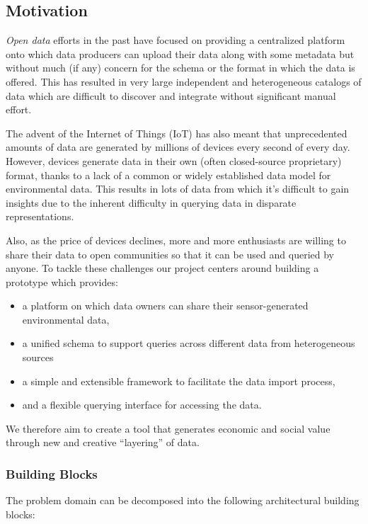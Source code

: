 \subsection{Motivation}\label{motivation}

\emph{Open data} efforts in the past have focused on providing a
centralized platform onto which data producers can upload their data
along with some metadata but without much (if any) concern for the
schema or the format in which the data is offered. This has resulted in
very large independent and heterogeneous catalogs of data which are
difficult to discover and integrate without significant manual effort.

The advent of the Internet of Things (IoT) has also meant that
unprecedented amounts of data are generated by millions of devices every
second of every day. However, devices generate data in their own (often
closed-source proprietary) format, thanks to a lack of a common or
widely established data model for environmental data. This results in
lots of data from which it's difficult to gain insights due to the
inherent difficulty in querying data in disparate representations.

Also, as the price of devices declines, more and more enthusiasts are
willing to share their data to open communities so that it can be used
and queried by anyone. To tackle these challenges our project centers
around building a prototype which provides:

\begin{itemize}
\tightlist
\item
  a platform on which data owners can share their sensor-generated
  environmental data,
\item
  a unified schema to support queries across different data from
  heterogeneous sources
\item
  a simple and extensible framework to facilitate the data import
  process,
\item
  and a flexible querying interface for accessing the data.
\end{itemize}

We therefore aim to create a tool that generates economic and social
value through new and creative ``layering'' of data.

\subsubsection{Building Blocks}\label{building-blocks}

The problem domain can be decomposed into the following architectural
building blocks:

